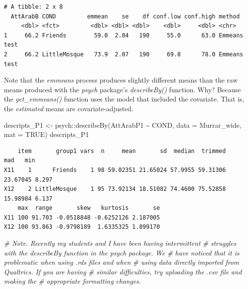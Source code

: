 \documentclass[
  11pt,
]{book}
\newenvironment{Shaded}{\begin{snugshade}}{\end{snugshade}}
\newcommand{\AttributeTok}[1]{\textcolor[rgb]{0.77,0.63,0.00}{#1}}
\newcommand{\CommentTok}[1]{\textcolor[rgb]{0.56,0.35,0.01}{\textit{#1}}}
\newcommand{\ConstantTok}[1]{\textcolor[rgb]{0.00,0.00,0.00}{#1}}
\newcommand{\FunctionTok}[1]{\textcolor[rgb]{0.00,0.00,0.00}{#1}}
\newcommand{\NormalTok}[1]{#1}
\newcommand{\OtherTok}[1]{\textcolor[rgb]{0.56,0.35,0.01}{#1}}
\newcommand{\SpecialCharTok}[1]{\textcolor[rgb]{0.00,0.00,0.00}{#1}}
\begin{document}
\begin{verbatim}
# A tibble: 2 x 8
  AttArabB COND         emmean    se    df conf.low conf.high method      
     <dbl> <fct>         <dbl> <dbl> <dbl>    <dbl>     <dbl> <chr>       
1     66.2 Friends        59.0  2.04   190     55.0      63.0 Emmeans test
2     66.2 LittleMosque   73.9  2.07   190     69.8      78.0 Emmeans test
\end{verbatim}

Note that the \emph{emmeans} process produces slightly different means than the raw means produced with the \emph{psych} package's \emph{describeBy()} function. Why? Because the \emph{get\_emmeans()} function uses the model that included the covariate. That is, the \emph{estimated} means are covariate-adjusted.

\begin{Shaded}
\begin{Highlighting}[]
\NormalTok{descripts\_P1 }\OtherTok{\textless{}{-}}\NormalTok{ psych}\SpecialCharTok{::}\FunctionTok{describeBy}\NormalTok{(AttArabP1 }\SpecialCharTok{\textasciitilde{}}\NormalTok{ COND, }\AttributeTok{data =}\NormalTok{ Murrar\_wide,}
    \AttributeTok{mat =} \ConstantTok{TRUE}\NormalTok{)}
\NormalTok{descripts\_P1}
\end{Highlighting}
\end{Shaded}

\begin{verbatim}
    item       group1 vars  n     mean       sd  median  trimmed      mad   min
X11    1      Friends    1 98 59.02351 21.65024 57.9955 59.31306 23.67045 8.297
X12    2 LittleMosque    1 95 73.92134 18.51082 74.4600 75.52858 15.98984 6.137
    max  range       skew   kurtosis       se
X11 100 91.703 -0.0518848 -0.6252126 2.187005
X12 100 93.863 -0.9798189  1.6335325 1.899170
\end{verbatim}

\begin{Shaded}
\begin{Highlighting}[]
\CommentTok{\# Note. Recently my students and I have been having intermittent}
\CommentTok{\# struggles with the describeBy function in the psych package. We}
\CommentTok{\# have noticed that it is problematic when using .rds files and when}
\CommentTok{\# using data directly imported from Qualtrics. If you are having}
\CommentTok{\# similar difficulties, try uploading the .csv file and making the}
\CommentTok{\# appropriate formatting changes.}
\end{Highlighting}
\end{Shaded}
\end{document}
